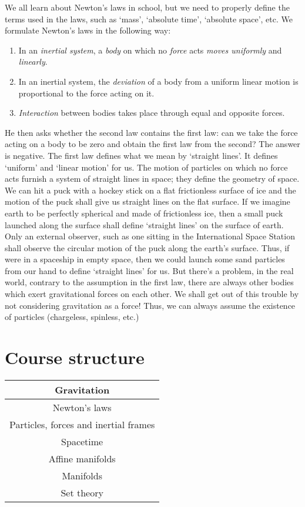 \documentclass[a4 paper, 12pt]{book}
\theoremstyle{definition}
\begin{document}
    We all learn about Newton's laws in school, but we need to properly define the terms used in the laws, such as `mass', `absolute time', `absolute space', etc. We formulate Newton's laws in the following way:
    \begin{enumerate}
        \item In an \textit{inertial system}, a \textit{body} on which no \textit{force} acts \textit{moves uniformly} and \textit{linearly}.
        \item In an inertial system, the \textit{deviation} of a body from a uniform linear motion is proportional to the force acting on it.
        \item \textit{Interaction} between bodies takes place through equal and opposite forces.
    \end{enumerate}
    He then asks whether the second law contains the first law: can we take the force acting on a body to be zero and obtain the first law from the second? The answer is negative. The first law defines what we mean by `straight lines'. It defines `uniform' and `linear motion' for us. The motion of particles on which no force acts furnish a system of straight lines in space; they define the geometry of space. We  can hit a puck with a hockey stick on a flat frictionless surface of ice and the motion of the puck shall give us straight lines on the flat surface. If we imagine earth to be perfectly spherical and made of frictionless ice, then a small puck launched along the surface shall define `straight lines' on the surface of earth. Only an external observer, such as one sitting in the International Space Station shall observe the circular motion of the puck along the earth's surface. Thus, if were in a spaceship in empty space, then we could launch some sand particles from our hand to define `straight lines' for us. But there's a problem, in the real world, contrary to the assumption in the first law, there are always other bodies which exert gravitational forces on each other. We shall get out of this trouble by not considering gravitation as a force! Thus, we can always assume the existence of particles (chargeless, spinless, etc.)

    \section{Course structure}

    \begin{center}
        \begin{tabular}{|c|}
            \hline
            Gravitation\\
            \hline
            Newton's laws\\
            \hline
            Particles, forces and inertial frames\\
            \hline
            Spacetime\\
            \hline
            Affine manifolds\\
            \hline
            Manifolds\\
            \hline
            Set theory\\
            \hline
        \end{tabular}
    \end{center}
\end{document}
